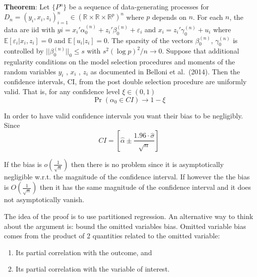 \documentclass[12pt,]{book}
\providecommand{\tightlist}{%
  \setlength{\itemsep}{0pt}\setlength{\parskip}{0pt}}
\begin{document}
\textbf{Theorem}:
Let \(\{P^n\}\) be a sequence of data-generating processes for \(D_n = (y_i, x_i, z_i)^n_{i=1} \in (\mathbb R \times \mathbb R \times \mathbb R^p) ^n\) where \(p\) depends on \(n\). For each \(n\), the data are iid with \(yi = x_i'\alpha_0^{(n)} + z_i' \beta_0^{(n)} + \varepsilon_i\) and \(x_i = z_i' \gamma_0^{(n)} + u_i\) where \(\mathbb E[\varepsilon_i | x_i,z_i] = 0\) and \(\mathbb E[u_i|z_i] = 0\). The sparsity of the vectors \(\beta_0^{(n)}\), \(\gamma_0^{(n)}\) is controlled by \(|| \beta_0^{(n)} ||_0 \leq s\) with \(s^2 (\log p)^2/n \to 0\). Suppose that additional regularity conditions on the model selection procedures and moments of the random variables \(y_i\) , \(x_i\) , \(z_i\) as documented in Belloni et al.~(2014). Then the confidence intervals, CI, from the post double selection procedure are uniformly valid. That is, for any confidence level \(\xi \in (0, 1)\)
\[
        \Pr(\alpha_0 \in CI) \to 1- \xi
\]

In order to have valid confidence intervals you want their bias to be negligibly. Since
\[
  CI = \left[ \hat{\alpha} \pm \frac{1.96 \cdot \hat{\sigma}}{\sqrt{n}} \right]
\]

If the bias is \(o \left( \frac{1}{\sqrt{n}} \right)\) then there is no problem since it is asymptotically negligible w.r.t. the magnitude of the confidence interval. If however the the bias is \(O \left( \frac{1}{\sqrt{n}} \right)\) then it has the same magnitude of the confidence interval and it does not asymptotically vanish.

The idea of the proof is to use partitioned regression. An alternative way to think about the argument is: bound the omitted variables bias. Omitted variable bias comes from the product of 2 quantities related to the omitted variable:

\begin{enumerate}
\def\labelenumi{\arabic{enumi}.}
\tightlist
\item
  Its partial correlation with the outcome, and
\item
  Its partial correlation with the variable of interest.
\end{enumerate}
\end{document}
